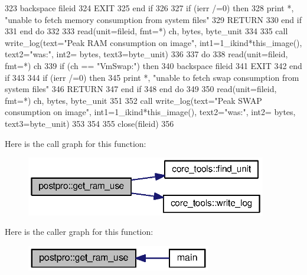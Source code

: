 \begin{DoxyCode}
323         backspace fileid
324         \textcolor{keywordflow}{EXIT}
325 \textcolor{keywordflow}{      end if}
326 
327       \textcolor{keywordflow}{if} (ierr /=0) \textcolor{keywordflow}{then}
328         print *, \textcolor{stringliteral}{"unable to fetch memory consumption from system files"}
329         \textcolor{keywordflow}{RETURN}
330 \textcolor{keywordflow}{      end if}
331 \textcolor{keywordflow}{    end do}
332 
333     \textcolor{keyword}{read}(unit=fileid, fmt=*) ch, bytes, byte\_unit
334 
335     \textcolor{keyword}{call }write_log(text=\textcolor{stringliteral}{"Peak RAM  consumption on image"}, int1=1\_ikind*this\_image(), text2=\textcolor{stringliteral}{"was:"}, int2=
      bytes, text3=byte\_unit)
336 
337     \textcolor{keywordflow}{do} 
338       \textcolor{keyword}{read}(unit=fileid, fmt=*) ch
339       \textcolor{keywordflow}{if} (ch == \textcolor{stringliteral}{"VmSwap:"}) \textcolor{keywordflow}{then}
340         backspace fileid
341         \textcolor{keywordflow}{EXIT}
342 \textcolor{keywordflow}{      end if}
343 
344       \textcolor{keywordflow}{if} (ierr /=0) \textcolor{keywordflow}{then}
345         print *, \textcolor{stringliteral}{"unable to fetch swap consumption from system files"}
346         \textcolor{keywordflow}{RETURN}
347 \textcolor{keywordflow}{      end if}
348 \textcolor{keywordflow}{    end do}
349 
350     \textcolor{keyword}{read}(unit=fileid, fmt=*) ch, bytes, byte\_unit
351 
352     \textcolor{keyword}{call }write_log(text=\textcolor{stringliteral}{"Peak SWAP consumption on image"}, int1=1\_ikind*this\_image(), text2=\textcolor{stringliteral}{"was:"}, int2=
      bytes, text3=byte\_unit)
353 
354 
355     \textcolor{keyword}{close}(fileid)
356 
\end{DoxyCode}


Here is the call graph for this function\+:\nopagebreak
\begin{figure}[H]
\begin{center}
\leavevmode
\includegraphics[width=298pt]{namespacepostpro_ad7dbd8a9caed2ac75b253d6b46d098d2_cgraph}
\end{center}
\end{figure}




Here is the caller graph for this function\+:\nopagebreak
\begin{figure}[H]
\begin{center}
\leavevmode
\includegraphics[width=229pt]{namespacepostpro_ad7dbd8a9caed2ac75b253d6b46d098d2_icgraph}
\end{center}
\end{figure}


